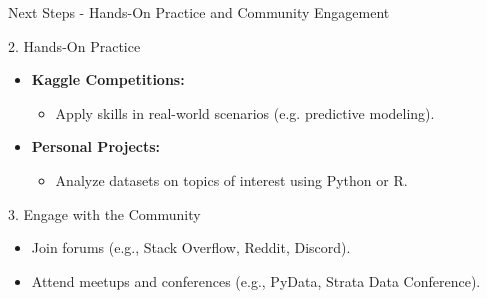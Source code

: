 \documentclass[aspectratio=169]{beamer}
\begin{document}
\begin{frame}[fragile]{Next Steps - Hands-On Practice and Community Engagement}
    \begin{block}{2. Hands-On Practice}
        \begin{itemize}
            \item \textbf{Kaggle Competitions:} 
            \begin{itemize}
                \item Apply skills in real-world scenarios (e.g. predictive modeling).
            \end{itemize}
            \item \textbf{Personal Projects:} 
            \begin{itemize}
                \item Analyze datasets on topics of interest using Python or R.
            \end{itemize}
        \end{itemize}
    \end{block}

    \begin{block}{3. Engage with the Community}
        \begin{itemize}
            \item Join forums (e.g., Stack Overflow, Reddit, Discord).
            \item Attend meetups and conferences (e.g., PyData, Strata Data Conference).
        \end{itemize}
    \end{block}
\end{frame}
\end{document}
